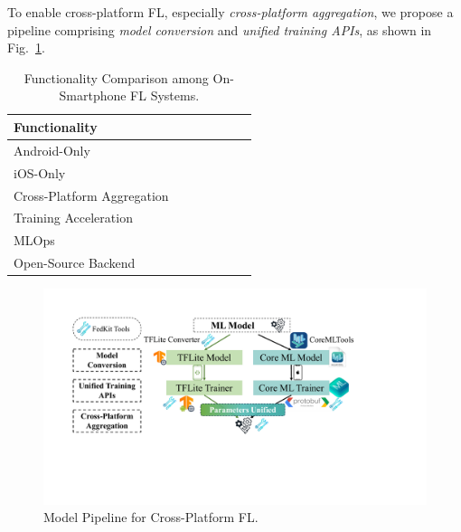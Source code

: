 \documentclass[conference]{IEEEtran}
\begin{document}
To enable cross-platform FL,
especially \textit{cross-platform aggregation},
we propose a pipeline comprising
\textit{model conversion} and
\textit{unified training APIs},
as shown in Fig.~\ref{cross_fl}.

\begin{table}
    \centering
    \small
    \newcommand{\Ys}{\ding{51}}
    \newcommand{\No}{\ding{55}}
\begin{tabular}{lcccccc}
Functionality               & \cite{he2020fedml}
                                    & \cite{madrigal2023project}
                                            & \cite{mathur2021ondevice}
                                                    & \cite{hall2021syft}
                                                            & \FedKit{}\\
\hline
Android-Only                & \Ys   & \Ys   & \Ys   & \Ys   & \Ys   \\
iOS-Only                    & \No   & \No   & \Ys   & \Ys   & \Ys   \\
Cross-Platform Aggregation  & \No   & \No   & \No   & \Ys   & \Ys   \\\hline
Training Acceleration       & \Ys   & \Ys   & \Ys   & \No   & \Ys   \\
MLOps                       & \Ys   & \Ys   & \No   & \No   & \Ys   \\
Open-Source Backend         & \No   & \No   & \Ys   & \Ys   & \Ys   \\
\end{tabular}
\caption{Functionality Comparison among On-Smartphone FL Systems.}
\label{tbl:fn-systems}
\end{table}

\begin{figure}
    \centering
    \includegraphics*[width=\linewidth]{model_pipeline.pdf}
    \caption{\FedKit{} Model Pipeline for Cross-Platform FL.}
    \label{cross_fl}
\end{figure}
\end{document}
